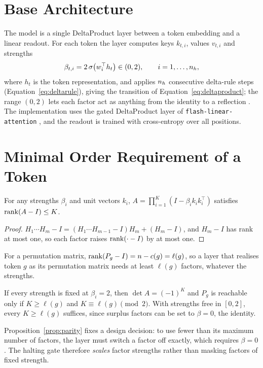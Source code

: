 \section{Base Architecture}
\label{sec:base}
The model is a single DeltaProduct layer \cite{deltaproduct} between a token embedding and a linear readout. For each token the layer computes keys $k_{t,i}$, values $v_{t,i}$ and strengths
\begin{equation}
\beta_{t,i} = 2\,\sigma\!\left(w_i^\top h_t\right) \in (0,2), \qquad i = 1,\dots,n_h,
\label{eq:beta}
\end{equation}
where $h_t$ is the token representation, and applies $n_h$ consecutive delta-rule steps (Equation~\ref{eq:deltarule}), giving the transition of Equation~\ref{eq:deltaproduct}; the range $(0,2)$ lets each factor act as anything from the identity to a reflection \cite{negeig}. The implementation uses the gated DeltaProduct layer of \texttt{flash-linear-attention} \cite{fla}, and the readout is trained with cross-entropy over all positions.

\section{Minimal Order Requirement of a Token}
\label{sec:demand}
\begin{proposition}
\label{prop:rank}
For any strengths $\beta_i$ and unit vectors $k_i$, $A = \prod_{i=1}^{K}(I - \beta_i k_i k_i^\top)$ satisfies $\operatorname{rank}(A - I) \le K$.
\end{proposition}
\begin{proof}
$H_1\cdots H_m - I = (H_1\cdots H_{m-1} - I)H_m + (H_m - I)$, and $H_m - I$ has rank at most one, so each factor raises $\operatorname{rank}(\cdot - I)$ by at most one.
\end{proof}
For a permutation matrix, $\operatorname{rank}(P_g - I) = n - c(g) = \ell(g)$, so a layer that realises token $g$ as its permutation matrix needs at least $\ell(g)$ factors, whatever the strengths.

\begin{proposition}
\label{prop:parity}
If every strength is fixed at $\beta_i = 2$, then $\det A = (-1)^K$ and $P_g$ is reachable only if $K \ge \ell(g)$ and $K \equiv \ell(g) \pmod 2$. With strengths free in $[0,2]$, every $K \ge \ell(g)$ suffices, since surplus factors can be set to $\beta = 0$, the identity.
\end{proposition}
Proposition~\ref{prop:parity} fixes a design decision: to use fewer than its maximum number of factors, the layer must switch a factor off exactly, which requires $\beta=0$. The halting gate therefore \emph{scales} factor strengths rather than masking factors of fixed strength.

